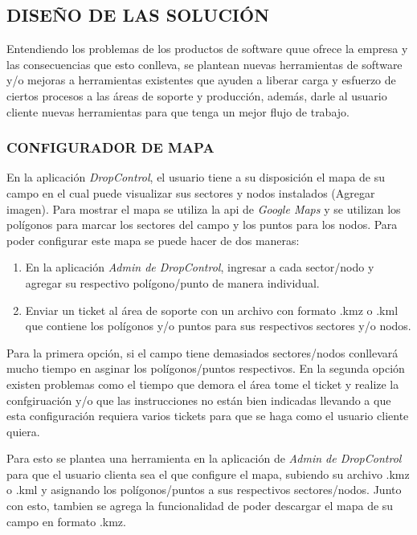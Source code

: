 

\subsection{DISEÑO DE LAS SOLUCIÓN}

Entendiendo los problemas de los productos de software quue ofrece la empresa y las consecuencias que esto conlleva,
se plantean nuevas herramientas de software y/o mejoras a herramientas existentes que ayuden a liberar carga y esfuerzo
de ciertos procesos a las áreas de soporte y producción, además, darle al usuario cliente nuevas herramientas para que tenga un mejor flujo de trabajo.

\subsubsection{CONFIGURADOR DE MAPA}

En la aplicación \textit{DropControl}, el usuario tiene a su disposición el mapa de su campo en el cual puede visualizar sus sectores y nodos instalados (Agregar imagen).
Para mostrar el mapa se utiliza la api de \textit{Google Maps} y se utilizan los polígonos para marcar los sectores del campo y los puntos para los nodos.
Para poder configurar este mapa se puede hacer de dos maneras:
\begin{enumerate}
    \item En la aplicación \textit{Admin de DropControl}, ingresar a cada sector/nodo y agregar su respectivo polígono/punto de manera individual.
    \item Enviar un ticket al área de soporte con un archivo con formato .kmz o .kml que contiene los polígonos y/o puntos para sus respectivos sectores y/o nodos.
\end{enumerate}
Para la primera opción, si el campo tiene demasiados sectores/nodos conllevará mucho tiempo en asginar los polígonos/puntos respectivos.
En la segunda opción existen problemas como el tiempo que demora el área tome el ticket y realize la confgiruación y/o
que las instrucciones no están bien indicadas llevando a que esta configuración requiera varios tickets para que se haga como el usuario cliente quiera.

Para esto se plantea una herramienta en la aplicación de \textit{Admin de DropControl} para que el usuario clienta sea el que
configure el mapa, subiendo su archivo .kmz o .kml y asignando los polígonos/puntos a sus respectivos sectores/nodos.
Junto con esto, tambien se agrega la funcionalidad de poder descargar el mapa de su campo en formato .kmz.

